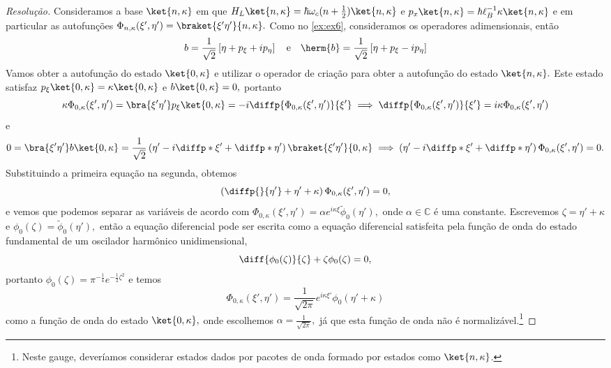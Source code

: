 \begin{proof}[Resolução]
   Consideramos a base \(\ket{n, \kappa}\) em que \(H_L \ket{n, \kappa} = \hbar \omega_c (n + \frac12) \ket{n,\kappa}\) e \(p_x \ket{n,\kappa} = \hbar \ell_B^{-1} \kappa \ket{n, \kappa}\) e em particular as autofunções \(\Phi_{n, \kappa}(\xi', \eta') = \braket{\xi'\eta'}{n,\kappa}.\) Como no \cref{ex:ex6}, consideramos os operadores adimensionais, então
   \begin{equation*}
      b = \frac{1}{\sqrt{2}} \left[\eta + p_\xi + ip_\eta\right]
      \quad\text{e}\quad
      \herm{b} = \frac{1}{\sqrt{2}} \left[\eta + p_\xi - ip_\eta\right]
   \end{equation*}
   Vamos obter a autofunção do estado \(\ket{0,\kappa}\) e utilizar o operador de criação para obter a autofunção do estado \(\ket{n, \kappa}.\) Este estado satisfaz \(p_\xi \ket{0,\kappa} = \kappa\ket{0,\kappa}\) e \(b\ket{0,\kappa} = 0,\) portanto 
   \begin{equation*}
      \kappa \Phi_{0, \kappa}(\xi', \eta') = \bra{\xi'\eta'} p_\xi \ket{0,\kappa} = -i \diffp{\Phi_{0, \kappa}(\xi', \eta')}{\xi'} \implies \diffp{\Phi_{0, \kappa}(\xi', \eta')}{\xi'} = i \kappa \Phi_{0, \kappa}(\xi', \eta')
   \end{equation*}
   e
   \begin{equation*}
      0 = \bra{\xi'\eta'} b \ket{0,\kappa}  = \frac{1}{\sqrt{2}}\left(\eta' - i \diffp*{}{\xi'} + \diffp*{}{\eta'}\right)\braket{\xi'\eta'}{0,\kappa} \implies \left(\eta' - i \diffp*{}{\xi'} + \diffp*{}{\eta'}\right)\Phi_{0, \kappa}(\xi', \eta') = 0.
   \end{equation*}
   Substituindo a primeira equação na segunda, obtemos
   \begin{equation*}
      \left(\diffp{}{\eta'} + \eta' +  \kappa\right)\Phi_{0, \kappa}(\xi', \eta') = 0,
   \end{equation*}
   e vemos que podemos separar as variáveis de acordo com \(\Phi_{0, \kappa}(\xi', \eta') = \alpha e^{i\kappa \xi} \tilde{\phi}_0(\eta'),\) onde \(\alpha \in \mathbb{C}\) é uma constante. Escrevemos \(\zeta = \eta' + \kappa\) e \(\phi_0(\zeta) = \tilde{\phi}_0(\eta'),\) então a equação diferencial pode ser escrita como a equação diferencial satisfeita pela função de onda do estado fundamental de um oscilador harmônico unidimensional,
   \begin{equation*}
      \diff{\phi_0(\zeta)}{\zeta} + \zeta \phi_0(\zeta) = 0,
   \end{equation*}
   portanto \(\phi_0(\zeta) = \pi^{-\frac14} e^{-\frac12 \zeta^2}\) e temos
   \begin{equation*}
      \Phi_{0, \kappa}(\xi', \eta') = \frac{1}{\sqrt{2\pi}}e^{i\kappa \xi'} \phi_0(\eta' + \kappa)
   \end{equation*}
   como a função de onda do estado \(\ket{0,\kappa},\) onde escolhemos \(\alpha = \frac{1}{\sqrt{2\pi}},\) já que esta função de onda não é normalizável.\footnote{Neste gauge, deveríamos considerar estados dados por pacotes de onda formado por estados como \(\ket{n, \kappa}\).} 


\end{proof}

